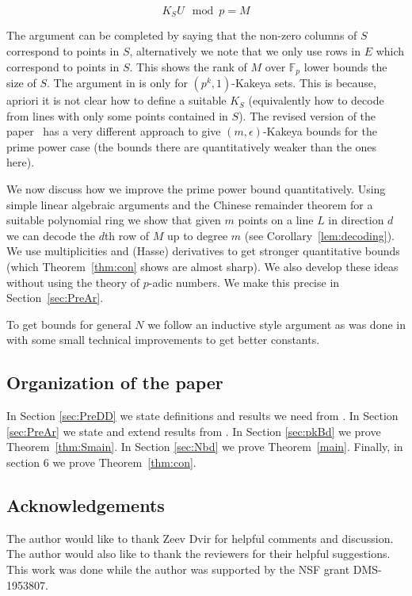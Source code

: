 \documentclass[11pt]{article}
\numberwithin{equation}{section}
\def\F{{\mathbb{F}}}
\begin{document}
\begin{equation}\label{eq:proofOverTorusPoly}
    K_SU  \mod p = M
\end{equation}

The argument can be completed by saying that the non-zero columns of $S$ correspond to points in $S$, alternatively we note that we only use rows in $E$ which correspond to points in $S$. This shows the rank of $M$ over $\F_p$ lower bounds the size of $S$. The argument in \cite{arsovski2021padic} is only for $(p^k,1)$-Kakeya sets. This is because, apriori it is not clear how to define a suitable $K_S$ (equivalently how to decode from lines with only some points contained in $S$). The revised version of the paper~\cite{arsovskiNew} has a very different approach to give $(m,\epsilon)$-Kakeya bounds for the prime power case (the bounds there are quantitatively weaker than the ones here).

We now discuss how we improve the prime power bound quantitatively. Using simple linear algebraic arguments and the Chinese remainder theorem for a suitable polynomial ring we show that given $m$ points on a line $L$ in direction $d$ we can decode the $d$th row of $M$ up to degree $m$ (see Corollary~\ref{lem:decoding}). We use multiplicities and (Hasse) derivatives to get stronger quantitative bounds (which Theorem~\ref{thm:con} shows are almost sharp). We also develop these ideas without using the theory of $p$-adic numbers. We make this precise in Section~\ref{sec:PreAr}.

To get bounds for general $N$ we follow an inductive style argument as was done in \cite{dhar2021proof} with some small technical improvements to get better constants.

\subsection{Organization of the paper}
In Section \ref{sec:PreDD} we state definitions and results we need from \cite{dhar2021proof}. In Section \ref{sec:PreAr} we state and extend results from \cite{arsovski2021padic}. In Section \ref{sec:pkBd} we prove Theorem~\ref{thm:Smain}. In Section \ref{sec:Nbd} we prove Theorem~\ref{main}. Finally, in section 6 we prove Theorem~\ref{thm:con}.

\subsection{Acknowledgements}
The author would like to thank Zeev Dvir for helpful comments and discussion. The author would also like to thank the reviewers for their helpful suggestions. This work was done while the author was supported by the NSF grant DMS-1953807.
\end{document}
